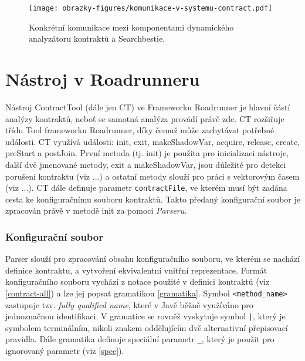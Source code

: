 \begin{figure}[!htb]
    \centering
    \texttt{[image: obrazky-figures/komunikace-v-systemu-contract.pdf]}
    \caption{Konkrétní komunikace mezi komponentami dynamického analyzátoru kontraktů a Searchbestie.}
    \label{komunikace-contract}
\end{figure}

\section{Nástroj v Roadrunneru}\label{navrh-rr-nastroj}


Nástroj ContractTool (dále jen CT) ve Frameworku Roadrunner je hlavní částí analýzy kontraktů, neboť se samotná analýza provádí právě zde. CT rozšiřuje třídu Tool frameworku Roadrunner, díky čemuž může zachytávat potřebné události. CT využívá události: init, exit, makeShadowVar, acquire, release, create, preStart a postJoin. První metoda (tj. init) je použita pro inicializaci nástroje, další dvě jmenované metody, exit a makeShadowVar, jsou důležité pro detekci porušení kontraktu (viz ...) a ostatní metody slouží pro práci s vektorovým časem (viz ...). CT dále definuje parametr \texttt{contractFile}, ve kterém musí být zadána cesta ke konfiguračnímu souboru kontraktů. Takto předaný konfigurační soubor je zpracován právě v metodě init za pomoci \textit{Parseru}.

\subsubsection{Konfigurační soubor}\label{config-file}

Parser slouží pro zpracování obsahu konfiguračního souboru, ve kterém se nachází definice kontraktu, a vytvoření ekvivalentní vnitřní reprezentace. Formát konfiguračního souboru vychází z notace použité v definici kontraktů (viz \ref{contract-all}) a lze jej popsat gramatikou \ref{gramatika}. Symbol \texttt{<method_name>} zastupuje tzv. \textit{fully qualified name}, které v Javě běžně využíváno pro jednoznačnou identifikaci. V gramatice se rovněž vyskytuje symbol \texttt{|}, který je symbolem terminálním, nikoli znakem oddělujícím dvě alternativní přepisovací pravidla. Dále gramatika definuje speciální parametr \texttt{\_}, který je použit pro ignorovaný parametr (viz \ref{spec}).

